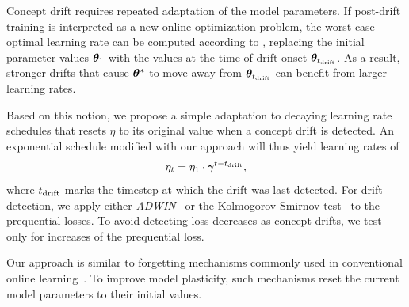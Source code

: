 \documentclass{article} %
\begin{document}
Concept drift requires repeated adaptation of the model parameters.
If post-drift training is interpreted as a new online optimization problem, the worst-case optimal learning rate can be computed according to , replacing the initial parameter values ${\bm{\theta}}_1$ with the values at the time of drift onset ${\bm{\theta}}_{t_{\rm{drift}}}$.
As a result, stronger drifts that cause ${\bm{\theta}}^*$ to move away from ${\bm{\theta}}_{t_{\rm{drift}}}$ can benefit from larger learning rates.

Based on this notion, we propose a simple adaptation to decaying learning rate schedules that resets $\eta$ to its original value when a concept drift is detected.
An exponential schedule modified with our approach will thus yield learning rates of
\begin{equation}
   \eta_t = \eta_1 \cdot \gamma^{t-t_{\rm{drift}}},
\end{equation}\label{eq:drift_reset}
where $t_{\rm{drift}}$ marks the timestep at which the drift was last detected.
For drift detection, we apply either \textit{ADWIN}~\citep{bifetLearningTimeChangingData2007} or the Kolmogorov-Smirnov test~\citep{masseyKolmogorovSmirnovTestGoodness1951} to the prequential losses.
To avoid detecting loss decreases as concept drifts, we test only for increases of the prequential loss.

Our approach is similar to forgetting mechanisms commonly used in conventional online learning~\citep{gamaSurveyConceptDrift2014}.
To improve model plasticity, such mechanisms  reset the current model parameters to their initial values.

   
\end{document}
